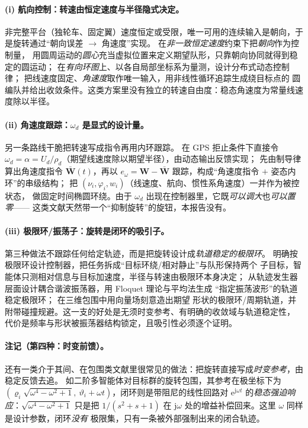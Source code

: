 \documentclass[11pt,a4paper]{ctexart}
\theoremstyle{plain}
\theoremstyle{definition}
\theoremstyle{remark}
\begin{document}
\paragraph{(i) 航向控制：转速由恒定速度与半径隐式决定。}
非完整平台（独轮车、固定翼）速度恒定或受限，唯一可用的连续输入是朝向，于是旋转通过“朝向误差
$\to$ 角速度”实现。\cite{sun2019circular} 在\emph{非一致恒定速度}约束下把\emph{朝向}作为控制量，
用圆周运动的\emph{圆心}充当虚拟位置来定义期望队形，只靠朝向协同就得到稳定的圆运动；
\cite{yu2016circular} 在\emph{有向环图}上、以各自局部坐标系为量测，设计分布式动态控制律；
\cite{tripathy2024cyclic} 把线速度固定、\emph{角速度}取作唯一输入，用非线性循环追踪生成绕目标点的
圆编队并给出收敛条件。这类方案里没有独立的转速自由度：稳态角速度为常量线速度除以半径。

\paragraph{(ii) 角速度跟踪：$\omega_d$ 是显式的设计量。}
另一条路线干脆把转速写成指令再用内环跟踪。\cite{wang2024gps} 在 GPS 拒止条件下直接令
$\omega_d=\alpha=U_d/\rho_d$（期望线速度除以期望半径），由动态输出反馈实现；
\cite{shao2023encircling} 先由制导律算出角速度指令 $\bar{\mathbf W}(t)$，再以
$e_\omega=\mathbf W-\bar{\mathbf W}$ 跟踪，构成“角速度指令 $+$ 姿态内环”的串级结构；
\cite{mei2024elliptical} 把 $(\nu_i,\varphi_i,w_i)$（线速度、航向、惯性系角速度）一并作为被控状态，
做固定时间椭圆环绕。由于 $\omega_d$ 出现在控制器里，它既\emph{可以调大}也\emph{可以置零}——
这类文献天然带一个“抑制旋转”的旋钮，本报告没有。

\paragraph{(iii) 极限环/振荡子：旋转是闭环的吸引子。}
第三种做法不跟踪任何给定轨迹，而是把旋转设计成\emph{轨道稳定的极限环}。
\cite{wang2020limitcycle} 明确按极限环设计控制器，把任务拆成“目标环绕/相对静止”与队形保持两个
子目标，智能体只测相对信息与目标加速度，半径与转速由极限环本身决定；
\cite{liu2017oscillator} 从轨迹发生器层面设计耦合谐波振荡器，用 Floquet 理论与平均法生成
“指定振荡波形”的轨道稳定极限环；\cite{ranjan2024enclosing} 在三维包围中用向量场刻意造出期望
形状的极限环/周期轨道，并附带碰撞规避。这一支的好处是无须时变参考、有明确的收敛域与轨道稳定性，
代价是频率与形状被振荡器结构锁定，且吸引性必须逐个证明。

\paragraph{注记（第四种：时变前馈）。}
还有一类介于其间、在包围类文献里很常见的做法：把旋转直接写成\emph{时变参考}，由稳定反馈去追。
如二阶多智能体对目标群的旋转包围\cite{shi2017rotary}，其参考在极坐标下为
$(\varrho_i\sqrt{\omega^4-\omega^2+1},\ \vartheta_i+\omega t)$，闭环则是带阻尼的线性回路对
$\mathrm e^{\mathrm j\omega t}$ 的\emph{稳态强迫响应}：$\sqrt{\omega^4-\omega^2+1}$ 只是把
$1/(s^2+s+1)$ 在 $\mathrm j\omega$ 处的增益补偿回来。这里 $\omega$ 同样是设计参数，闭环\emph{没有}
极限集，只有一条被外部强制出来的闭合轨迹。
\end{document}
